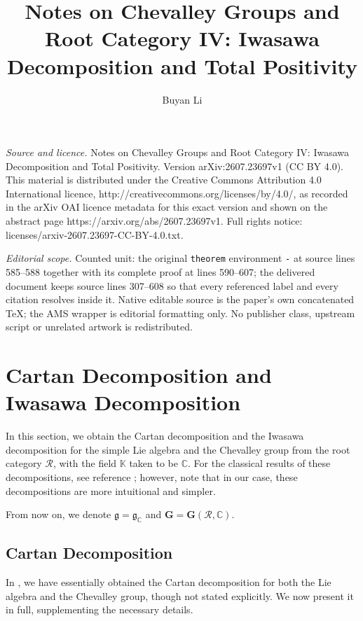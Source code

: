 \documentclass[10pt,a4paper]{amsart}
\begin{document}
\title[Notes on Chevalley Groups and Root Category IV: Iwasawa Deco]{Notes on Chevalley Groups and Root Category IV: Iwasawa Decomposition and Total Positivity}
\author{Buyan Li}
\date{}
\maketitle
\noindent\emph{Source and licence.} Notes on Chevalley Groups and Root Category IV: Iwasawa Decomposition and Total Positivity. Version arXiv:2607.23697v1 (CC BY 4.0). This material is distributed under the Creative Commons Attribution 4.0 International licence, http://creativecommons.org/licenses/by/4.0/, as recorded in the arXiv OAI licence metadata for this exact version and shown on the abstract page https://arxiv.org/abs/2607.23697v1. Full rights notice: licenses/arxiv-2607.23697-CC-BY-4.0.txt.\par\smallskip
\noindent\textit{Editorial scope.} Counted unit: the original \texttt{theorem} environment \texttt{-} at source lines 585--588 together with its complete proof at lines 590--607; the delivered document keeps source lines 307--608 so that every referenced label and every citation resolves inside it. Native editable source is the paper's own concatenated TeX; the AMS wrapper is editorial formatting only. No publisher class, upstream script or unrelated artwork is redistributed.
\section{Cartan Decomposition and Iwasawa Decomposition}
In this section, we obtain the Cartan decomposition and the Iwasawa decomposition for the simple Lie algebra and the Chevalley group from the root category $\mathcal{R}$, with the field $\mathbb{K}$ taken to be $\mathbb{C}$.
For the classical results of these decompositions, see reference \cite{Knapp}; however, note that in our case, these decompositions are more intuitional and simpler.

From now on, we denote $\mathfrak{g}=\mathfrak{g}_{\mathbb{C}}$ and $\mathbf{G}=\mathbf{G}(\mathcal{R},\mathbb{C})$.

\subsection{Cartan Decomposition}

In \cite{notes2}, we have essentially obtained the Cartan decomposition for both the Lie algebra and the Chevalley group, though not stated explicitly.
We now present it in full, supplementing the necessary details.
\end{document}
